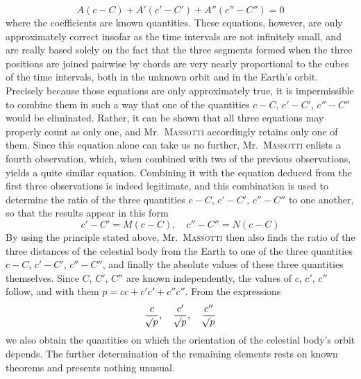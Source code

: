 \[
A(c-C)+A'(c'-C')+A''(c''-C'') = 0
\]
where the coefficients are known quantities. These equations, however, are only approximately correct insofar as the time intervals are not infinitely small, and are really based solely on the fact that the three segments formed when the three positions are joined pairwise by chords are very nearly proportional to the cubes of the time intervals, both in the unknown orbit and in the Earth’s orbit. Precisely because those equations are only approximately true, it is impermissible to combine them in such a way that one of the quantities $c-C$, $c'-C'$, $c''-C''$ would be eliminated. Rather, it can be shown that all three equations may properly count as only one, and Mr.\ \textsc{Massotti} accordingly retains only one of them. Since this equation alone can take us no further, Mr.\ \textsc{Massotti} enlists a fourth observation, which, when combined with two of the previous observations, yields a quite similar equation. Combining it with the equation deduced from the first three observations is indeed legitimate, and this combination is used to determine the ratio of the three quantities $c-C$, $c'-C'$, $c''-C''$ to one another, so that the results appear in this form
\[
c'-C' = M(c-C), \quad c''-C'' = N(c-C)
\]
By using the principle stated above, Mr.\ \textsc{Massotti} then also finds the ratio of the three distances of the celestial body from the Earth to one of the three quantities $c-C$, $c'-C'$, $c''-C''$, and finally the absolute values of these three quantities themselves. Since $C$, $C'$, $C''$ are known independently, the values of $c$, $c'$, $c''$ follow, and with them $p = cc+c'c'+c''c''$. From the expressions
\[
\frac{c}{\mathord{{}^{}\!\surd}p}, \quad \frac{c'}{\mathord{{}^{}\!\surd}p}, \quad \frac{c''}{\mathord{{}^{}\!\surd}p}
\]
we also obtain the quantities on which the orientation of the celestial body’s orbit depends. The further determination of the remaining elements rests on known theorems and presents nothing unusual.

